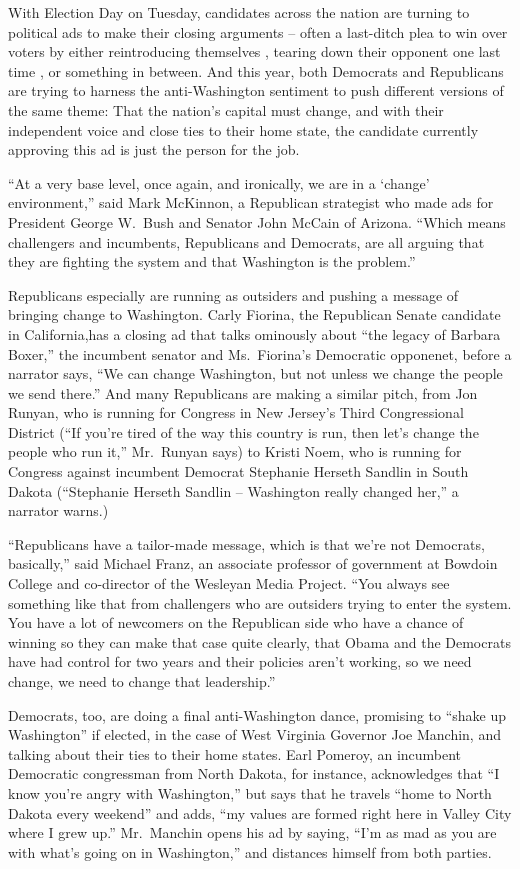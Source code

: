 ﻿\documentclass[12pt]{article}
\begin{document}
With Election Day on Tuesday, candidates across the nation are turning to political ads to make
their closing arguments -- often a last-ditch plea to win over voters by either reintroducing
themselves , tearing down their opponent one last time , or something in between. And this year,
both Democrats and Republicans are trying to harness the anti-Washington sentiment to push different
versions of the same theme: That the nation's capital must change, and with their independent voice
and close ties to their home state, the candidate currently approving this ad is just the person for
the job.

``At a very base level, once again, and ironically, we are in a `change' environment,'' said Mark
McKinnon, a Republican strategist who made ads for President George W.~Bush and Senator John McCain
of Arizona. ``Which means challengers and incumbents, Republicans and Democrats, are all arguing
that they are fighting the system and that Washington is the problem.''

Republicans especially are running as outsiders and pushing a message of bringing change to
Washington. Carly Fiorina, the Republican Senate candidate in California,has a closing ad that talks
ominously about ``the legacy of Barbara Boxer,'' the incumbent senator and Ms.~Fiorina's Democratic
opponenet, before a narrator says, ``We can change Washington, but not unless we change the people
we send there.'' And many Republicans are making a similar pitch, from Jon Runyan, who is running
for Congress in New Jersey's Third Congressional District (``If you're tired of the way this country
is run, then let's change the people who run it,'' Mr.~Runyan says) to Kristi Noem, who is running
for Congress against incumbent Democrat Stephanie Herseth Sandlin in South Dakota (``Stephanie
Herseth Sandlin -- Washington really changed her,'' a narrator warns.)

``Republicans have a tailor-made message, which is that we're not Democrats, basically,'' said
Michael Franz, an associate professor of government at Bowdoin College and co-director of the
Wesleyan Media Project. ``You always see something like that from challengers who are outsiders
trying to enter the system. You have a lot of newcomers on the Republican side who have a chance of
winning so they can make that case quite clearly, that Obama and the Democrats have had control for
two years and their policies aren't working, so we need change, we need to change that leadership.''

Democrats, too, are doing a final anti-Washington dance, promising to ``shake up Washington'' if
elected, in the case of West Virginia Governor Joe Manchin, and talking about their ties to their
home states. Earl Pomeroy, an incumbent Democratic congressman from North Dakota, for instance,
acknowledges that ``I know you're angry with Washington,'' but says that he travels ``home to North
Dakota every weekend'' and adds, ``my values are formed right here in Valley City where I grew up.''
Mr.~Manchin opens his ad by saying, ``I'm as mad as you are with what's going on in Washington,''
and distances himself from both parties.
\end{document}
